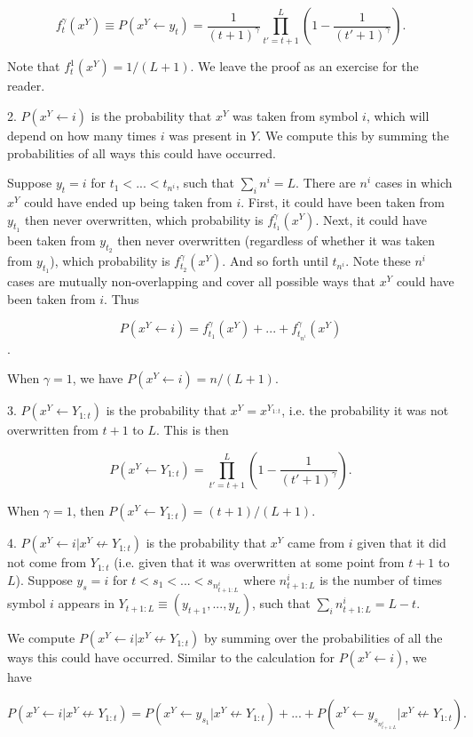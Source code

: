 \documentclass{article}
\begin{document}
$$f^\gamma_t(x^Y) \equiv P(x^Y \leftarrow y_t) = \frac{1}{(t+1)^\gamma}\prod\limits_{t' = t+1}^L\left(1 - \frac{1}{(t'+1)^\gamma}\right).$$

Note that $f^1_t(x^Y) = 1/(L+1)$. We leave the proof as an exercise for the reader.

2. $P(x^Y \leftarrow i)$ is the probability that $x^Y$ was taken from symbol $i$, which will depend on how many times $i$ was present in $Y$. We compute this by summing the probabilities of all ways this could have occurred.

Suppose $y_t = i$ for $t_1 < ... < t_{n^i}$, such that $\sum_i n^i = L$. There are $n^i$ cases in which $x^Y$ could have ended up being taken from $i$. First, it could have been taken from $y_{t_1}$ then never overwritten, which probability is $f^\gamma_{t_1}(x^Y)$. Next, it could have been taken from $y_{t_2}$ then never overwritten (regardless of whether it was taken from $y_{t_1}$), which probability is $f^\gamma_{t_2}(x^Y)$. And so forth until $t_{n^i}$. Note these $n^i$ cases are mutually non-overlapping and cover all possible ways that $x^Y$ could have been taken from $i$. Thus

$$P(x^Y \leftarrow i) = f^\gamma_{t_1}(x^Y) + ... + f^\gamma_{t_{n^i}}(x^Y)$$.

When $\gamma = 1$, we have $P(x^Y \leftarrow i) = n/(L+1)$.

3. $P(x^Y \leftarrow Y_{1:t})$ is the probability that $x^Y = x^{Y_{1:t}}$, i.e. the probability it was not overwritten from $t+1$ to $L$. This is then

$$P(x^Y \leftarrow Y_{1:t}) = \prod\limits_{t' = t+1}^L \left(1 - \frac{1}{(t'+1)^\gamma}\right).$$

When $\gamma = 1$, then $P(x^Y \leftarrow Y_{1:t}) = (t+1)/(L+1)$.

4. $P(x^Y \leftarrow i|x^Y \not \leftarrow Y_{1:t})$ is the probability that $x^Y$ came from $i$ given that it did not come from $Y_{1:t}$ (i.e. given that it was overwritten at some point from $t+1$ to $L$). Suppose $y_s = i$ for $t < s_1 < ... < s_{n^i_{t+1:L}}$ where $n^i_{t+1:L}$ is the number of times symbol $i$ appears in $Y_{t+1:L} \equiv (y_{t+1}, ..., y_L)$, such that $\sum_i n^i_{t+1:L} = L-t$.

We compute $P(x^Y \leftarrow i|x^Y \not \leftarrow Y_{1:t})$ by summing over the probabilities of all the ways this could have occurred. Similar to the calculation for $P(x^Y \leftarrow i)$, we have

$$P(x^Y \leftarrow i|x^Y \not \leftarrow Y_{1:t}) = P(x^Y \leftarrow y_{s_1}| x^Y \not \leftarrow Y_{1:t}) + ... + P(x^Y \leftarrow y_{s_{n^i_{t+1:L}}}| x^Y \not \leftarrow Y_{1:t}).$$
\end{document}
